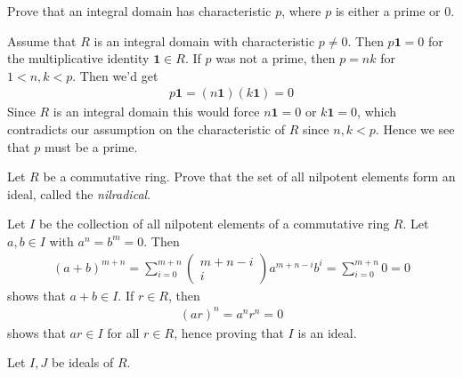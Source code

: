 \documentclass[12pt]{exam}
\theoremstyle{plain} %
\theoremstyle{definition} %
\theoremstyle{remark} %
\begin{document}
\begin{questions}
  \question
  Prove that an integral domain has characteristic $p$, where $p$ is
  either a prime or $0$.
  \begin{solution}
    Assume that $R$ is an integral domain with characteristic $p \neq
    0$. Then $p \textbf{1} = 0$ for the multiplicative identity
    $\textbf{1} \in R$. If $p$ was not a prime, then
    $p = nk$ for $1 < n, k < p$. Then we'd get
    \begin{align*}
      p \textbf{1} = (n \textbf{1})(k \textbf{1}) = 0
    \end{align*}
    Since $R$ is an integral domain this would force $n \textbf{1} =
    0$ or $k \textbf{1} = 0$, which contradicts our assumption on the
    characteristic of $R$ since $n, k < p$. Hence we see that $p$
    must be a prime.
  \end{solution}

  \question
  Let $R$ be a commutative ring. Prove that the set of all nilpotent
  elements form an ideal, called the \textit{nilradical}.
  \begin{solution}
    Let $I$ be the collection of all nilpotent elements of a
    commutative ring $R$. Let $a, b \in I$ with $a^n = b^m = 0$. Then
    \begin{align*}
      (a + b)^{m+n} = \sum_{i = 0}^{m+n}
      \begin{pmatrix}%
        m+n -i \\
        i
      \end{pmatrix} a^{m+n -i} b^i = \sum_{ i = 0}^{m+n} 0 = 0
    \end{align*}
    shows that $a + b \in I$. If $r \in R$, then
    \begin{align*}
      (ar)^n = a^nr^n = 0
    \end{align*}
    shows that $ar \in I$ for all $ r \in R$, hence proving that $I$
    is an ideal.
  \end{solution}

  \question
  Let $I, J$ be ideals of $R$.
\end{questions}
\end{document}
